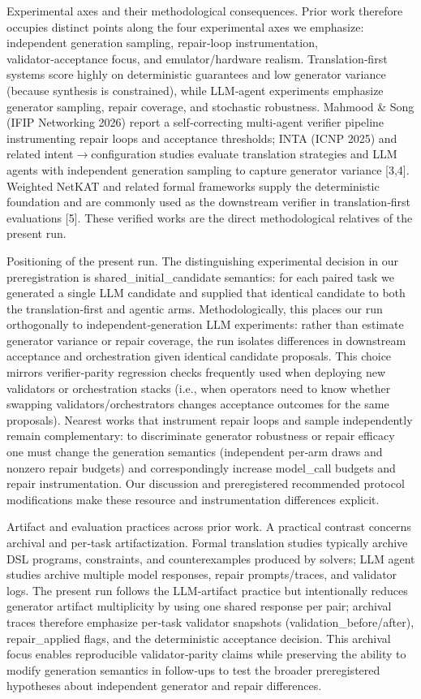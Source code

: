 \documentclass[conference]{IEEEtran}
\begin{document}
Experimental axes and their methodological consequences. Prior work therefore occupies distinct points along the four experimental axes we emphasize: independent generation sampling, repair‑loop instrumentation, validator‑acceptance focus, and emulator/hardware realism. Translation‑first systems score highly on deterministic guarantees and low generator variance (because synthesis is constrained), while LLM‑agent experiments emphasize generator sampling, repair coverage, and stochastic robustness. Mahmood \& Song (IFIP Networking 2026) report a self‑correcting multi‑agent verifier pipeline instrumenting repair loops and acceptance thresholds; INTA (ICNP 2025) and related intent\ensuremath{\rightarrow}configuration studies evaluate translation strategies and LLM agents with independent generation sampling to capture generator variance [3,4]. Weighted NetKAT and related formal frameworks supply the deterministic foundation and are commonly used as the downstream verifier in translation‑first evaluations [5]. These verified works are the direct methodological relatives of the present run.

Positioning of the present run. The distinguishing experimental decision in our preregistration is shared\_initial\_candidate semantics: for each paired task we generated a single LLM candidate and supplied that identical candidate to both the translation‑first and agentic arms. Methodologically, this places our run orthogonally to independent‑generation LLM experiments: rather than estimate generator variance or repair coverage, the run isolates differences in downstream acceptance and orchestration given identical candidate proposals. This choice mirrors verifier‑parity regression checks frequently used when deploying new validators or orchestration stacks (i.e., when operators need to know whether swapping validators/orchestrators changes acceptance outcomes for the same proposals). Nearest works that instrument repair loops and sample independently remain complementary: to discriminate generator robustness or repair efficacy one must change the generation semantics (independent per‑arm draws and nonzero repair budgets) and correspondingly increase model\_call budgets and repair instrumentation. Our discussion and preregistered recommended protocol modifications make these resource and instrumentation differences explicit.

Artifact and evaluation practices across prior work. A practical contrast concerns archival and per‑task artifactization. Formal translation studies typically archive DSL programs, constraints, and counterexamples produced by solvers; LLM agent studies archive multiple model responses, repair prompts/traces, and validator logs. The present run follows the LLM‑artifact practice but intentionally reduces generator artifact multiplicity by using one shared response per pair; archival traces therefore emphasize per‑task validator snapshots (validation\_before/after), repair\_applied flags, and the deterministic acceptance decision. This archival focus enables reproducible validator‑parity claims while preserving the ability to modify generation semantics in follow‑ups to test the broader preregistered hypotheses about independent generator and repair differences.
\end{document}
